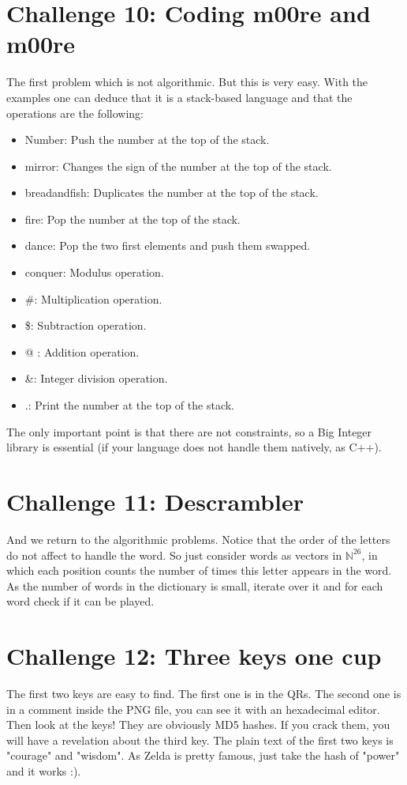 \documentclass[english,12pt,a4paper]{article}
\begin{document}
\section{Challenge 10: Coding m00re and m00re}
The first problem which is not algorithmic. But this is very easy. With the examples one can deduce that it is a stack-based language and that the operations are the following:
\begin{itemize}
\item Number: Push the number at the top of the stack.
\item mirror: Changes the sign of the number at the top of the stack.
\item breadandfish: Duplicates the number at the top of the stack.
\item fire: Pop the number at the top of the stack.
\item dance: Pop the two first elements and push them swapped.
\item conquer: Modulus operation.
\item \#: Multiplication operation.
\item \$: Subtraction operation.
\item \makeatletter @ : Addition operation.
\item \&: Integer division operation.
\item .: Print the number at the top of the stack.
\end{itemize}
The only important point is that there are not constraints, so a Big Integer library is essential (if your language does not handle them natively, as C++).


\newpage

\section{Challenge 11: Descrambler}
And we return to the algorithmic problems. Notice that the order of the letters do not affect to handle the word. So just consider words as vectors in $\mathbb{N}^{26}$, in which each position counts the number of times this letter appears in the word. As the number of words in the dictionary is small, iterate over it and for each word check if it can be played.

\newpage

\section{Challenge 12: Three keys one cup}
The first two keys are easy to find. The first one is in the QRs. The second one is in a comment inside the PNG file, you can see it with an hexadecimal editor. Then look at the keys! They are obviously MD5 hashes. If you crack them, you will have a revelation about the third key. The plain text of the first two keys is "courage" and "wisdom". As Zelda is pretty famous, just take the hash of "power" and it works :).
\end{document}
